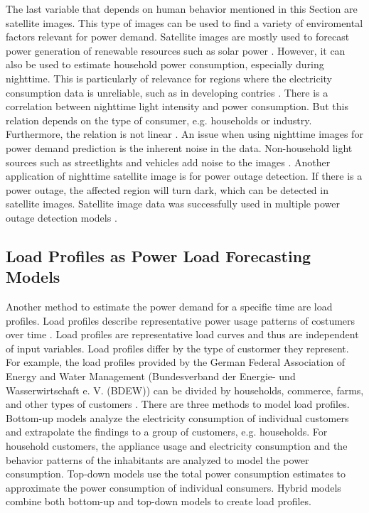 The last variable that depends on human behavior mentioned in this Section are
satellite images. This type of images can be used to find a variety 
of enviromental factors relevant for power demand.
Satellite images are mostly used to forecast power generation of 
renewable resources such as solar power \cite{solarprediction}.
However, it can also be used to estimate household power consumption,
especially during nighttime. This is particularly of relevance for regions 
where the electricity consumption data is unreliable, such as in developing contries
\cite{reviewnighttime}. There is a correlation 
between nighttime light intensity and power consumption.
But this relation depends on the type of consumer, e.g. households or industry. 
Furthermore, the relation is not linear \cite{nighttimepowerestimation}. 
An issue when using nighttime images for power demand prediction is 
the inherent noise in the data. Non-household light sources such as 
streetlights and vehicles add noise to the images \cite{reviewnighttime}.
Another application of nighttime satellite image is for power outage detection.
If there is a power outage, the affected region will turn dark, which 
can be detected in satellite images. Satellite image data 
was successfully used in multiple power outage detection models
\cite{nightpoweroutage} \cite{twitterpoweroutagelighttime}.

\subsection{Load Profiles as Power Load Forecasting Models}
\label{loadprofilebasic}
Another method to estimate the power demand for a specific time are load 
profiles. Load profiles describe representative power usage patterns 
of costumers over time \cite{proedrou2021comprehensive}. Load profiles are 
representative load curves and thus are independent of input variables.
Load profiles differ by the type of custormer they represent. For 
example, the load profiles provided by the German Federal Association of 
Energy and Water Management (Bundesverband der Energie- und Wasserwirtschaft 
e. V. (BDEW)) can be divided by households, commerce, 
farms, and other types of customers \cite{meier1999reprasentative}.
There are three methods to model load profiles.
Bottom-up models analyze the electricity consumption of individual customers
and extrapolate the findings to a group of customers, e.g. households.
For household customers, the appliance usage and electricity consumption 
and the behavior patterns of the inhabitants are analyzed to model
the power consumption. Top-down models use the total power consumption 
estimates to approximate the power consumption of individual consumers.
Hybrid models combine both bottom-up and top-down models to create 
load profiles. 

